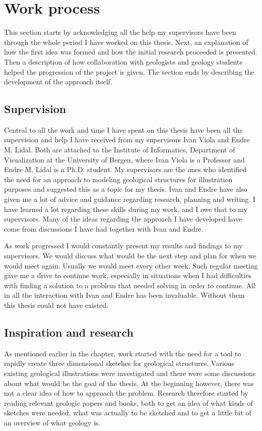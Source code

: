 \documentclass[a4paper,12pt]{report}
\begin{document}
\section{Work process}
\label{subsec:work}
This section starts by acknowledging all the help my supervisors have been through the whole period I have worked on this thesis. Next, an explanation of how the first idea was formed and how the initial research proceeded is presented. Then a description of how collaboration with geologists and geology students helped the progression of the project is given. The section ends by describing the development of the approach itself.

\subsection{Supervision}
Central to all the work and time I have spent on this thesis have been all the supervision and help I have received from my supervisors Ivan Viola and Endre M. Lidal. Both are attached to the Institute of Informatics, Department of Visualization at the University of Bergen, where Ivan Viola is a Professor and Endre M. Lidal is a Ph.D. student. My supervisors are the ones who identified the need for an approach to modeling geological structures for illustration purposes and suggested this as a topic for my thesis. Ivan and Endre have also given me a lot of advice and guidance regarding research, planning and writing. I have learned a lot regarding these skills during my work, and I owe that to my supervisors. Many of the ideas regarding the approach I have developed have come from discussions I have had together with Ivan and Endre.

As work progressed I would constantly present my results and findings to my supervisors.  We would discuss what would be the next step and plan for when we would meet again. Usually we would meet every other week. Such regular meeting gave me a drive to continue work, especially in situations when I had difficulties with finding a solution to a problem that needed solving in order to continue. All in all the interaction with Ivan and Endre has been invaluable. Without them this thesis could not have existed.


\subsection{Inspiration and research}
As mentioned earlier in the chapter, work started with the need for a tool to rapidly create three dimensional sketches for geological structures. Various existing geological illustrations were investigated and there were some discussions about what would be the goal of the thesis. At the beginning however, there was not a clear idea of how to approach the problem. Research therefore started by reading  relevant geologic papers and books, both to get an idea of what kinds of sketches were needed, what was actually to be sketched and to get a little bit of an overview of what geology is.
\end{document}
